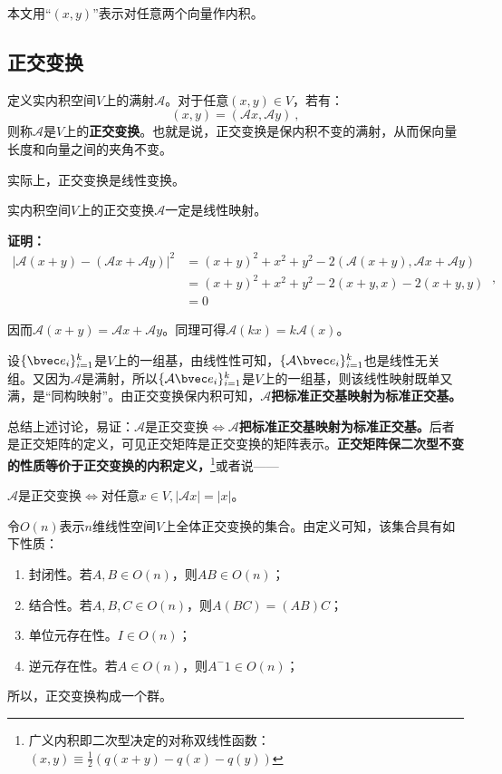 
本文用“$(x,y)$”表示对任意两个向量作内积。
\subsection{正交变换}
\begin{definition}{}
定义实内积空间$V$上的满射$\mathcal A$。对于任意$(x,y)\in V$，若有：
\begin{equation}
(x,y)=(\mathcal A x,\mathcal A y)~,
\end{equation}
则称$\mathcal A$是$V$上的\textbf{正交变换}。也就是说，正交变换是保内积不变的满射，从而保向量长度和向量之间的夹角不变。
\end{definition}
实际上，正交变换是线性变换。
\begin{theorem}{}
实内积空间$V$上的正交变换$\mathcal A$一定是线性映射。
\end{theorem}
\textbf{证明：}
\begin{equation}
\begin{aligned}
|\mathcal A(x+y)-(\mathcal Ax+\mathcal Ay)|^2&=(x+y)^2+x^2+y^2-2\left(\mathcal A(x+y),\mathcal Ax+\mathcal Ay\right)\\
&=(x+y)^2+x^2+y^2-2(x+y,x)-2(x+y,y)\\
&=0
\end{aligned}
~,\end{equation}

因而$\mathcal A(x+y)=\mathcal Ax+\mathcal Ay$。同理可得$\mathcal A(kx)=k\mathcal A(x)$。

设$\{\bvec e_i\}^k_{i=1}$是$V$上的一组基，由线性性可知，$\{\mathcal A\bvec e_i\}^k_{i=1}$也是线性无关组。又因为$\mathcal A$是满射，所以$\{\mathcal A\bvec e_i\}^k_{i=1}$是$V$上的一组基，则该线性映射既单又满，是“同构映射”。由正交变换保内积可知，$\mathcal A$\textbf{把标准正交基映射为标准正交基。}

总结上述讨论，易证：$\mathcal A$是正交变换$\Longleftrightarrow \mathcal A$\textbf{把标准正交基映射为标准正交基。}后者是正交矩阵的定义，可见正交矩阵是正交变换的矩阵表示。\textbf{正交矩阵保二次型不变的性质等价于正交变换的内积定义，}\footnote{广义内积即二次型决定的对称双线性函数：$(x,y)\equiv \frac{1}{2}(q(x+y)-q(x)-q(y))$}或者说——

$\mathcal A$是正交变换$\Longleftrightarrow $对任意$x\in V,|\mathcal Ax|=|x|$。

令$O(n)$表示$n$维线性空间$V$上全体正交变换的集合。由定义可知，该集合具有如下性质：
\begin{enumerate}
\item 封闭性。若$A,B\in O(n)$，则$AB\in O(n)$；
\item 结合性。若$A,B,C\in O(n)$，则$A(BC)=(AB)C$；
\item 单位元存在性。$I\in O(n)$；
\item 逆元存在性。若$A\in O(n)$，则$A^-1\in O(n)$；
\end{enumerate}
所以，正交变换构成一个群。

